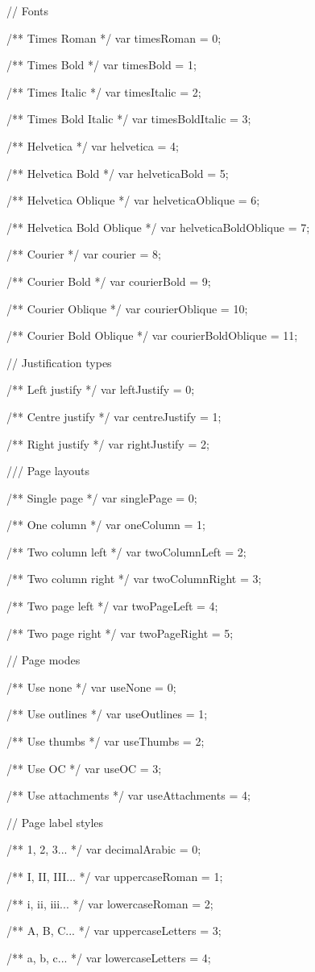 // Fonts

/** Times Roman */
var timesRoman = 0;

/** Times Bold */
var timesBold = 1;

/** Times Italic */
var timesItalic = 2;

/** Times Bold Italic */
var timesBoldItalic = 3;

/** Helvetica */
var helvetica = 4;

/** Helvetica Bold */
var helveticaBold = 5;

/** Helvetica Oblique */
var helveticaOblique = 6;

/** Helvetica Bold Oblique */
var helveticaBoldOblique = 7;

/** Courier */
var courier = 8;

/** Courier Bold */
var courierBold = 9;

/** Courier Oblique */
var courierOblique = 10;

/** Courier Bold Oblique */
var courierBoldOblique = 11;


// Justification types

/** Left justify */
var leftJustify = 0;

/** Centre justify */
var centreJustify = 1;

/** Right justify */
var rightJustify = 2;


/// Page layouts

/** Single page */
var singlePage = 0;

/** One column */
var oneColumn = 1;

/** Two column left */
var twoColumnLeft = 2;

/** Two column right */
var twoColumnRight = 3;

/** Two page left */
var twoPageLeft = 4;

/** Two page right */
var twoPageRight = 5;


// Page modes

/** Use none */
var useNone = 0;

/** Use outlines */
var useOutlines = 1;

/** Use thumbs */
var useThumbs = 2;

/** Use OC */
var useOC = 3;

/** Use attachments */
var useAttachments = 4;


// Page label styles

/** 1, 2, 3... */
var decimalArabic = 0;

/** I, II, III... */
var uppercaseRoman = 1;

/** i, ii, iii... */
var lowercaseRoman = 2;

/** A, B, C... */
var uppercaseLetters = 3;

/** a, b, c... */
var lowercaseLetters = 4;
